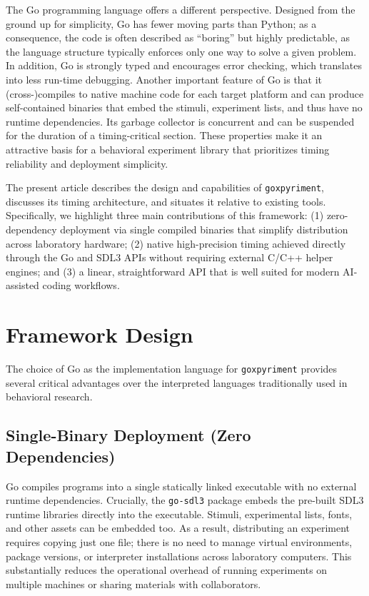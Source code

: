 \documentclass[jou,a4paper]{apa7}
\begin{document}
The Go programming language \parencite{donovan2016} offers a different
perspective. Designed from the ground up for simplicity, Go has fewer
moving parts than Python; as a consequence, the code is often
described as ``boring'' but highly predictable, as the language
structure typically enforces only one way to solve a given problem. In
addition, Go is strongly typed and encourages error checking, which
translates into less run-time debugging. Another important feature of
Go is that it (cross-)compiles to native machine code for each target
platform and can produce self-contained binaries that embed the
stimuli, experiment lists, and thus have no runtime dependencies. Its
garbage collector is concurrent and can be suspended for the duration
of a timing-critical section. These properties make it an attractive
basis for a behavioral experiment library that prioritizes timing
reliability and deployment simplicity.

The present article describes the design and capabilities of
\texttt{goxpyriment}, discusses its timing architecture, and situates it
relative to existing tools. Specifically, we highlight three main contributions
of this framework: (1) zero-dependency deployment via single compiled binaries
that simplify distribution across laboratory hardware; (2) native high-precision
timing achieved directly through the Go and SDL3 APIs without requiring external
C/C++ helper engines; and (3) a linear, straightforward API that is well
suited for modern AI-assisted coding workflows.

\section{Framework Design}\label{framework-design}

The choice of Go as the implementation language for \texttt{goxpyriment} provides
several critical advantages over the interpreted languages traditionally used in
behavioral research.

\subsection{Single-Binary Deployment (Zero Dependencies)}\label{single-binary-deployment}

Go compiles programs into a single statically linked executable with no
external runtime dependencies. Crucially, the \texttt{go-sdl3} package
embeds the pre-built SDL3 runtime libraries \parencite{sdl3} directly into the
executable. Stimuli, experimental lists, fonts, and other assets can be
embedded too. As a result, distributing an experiment requires copying just one
file; there is no need to manage virtual environments, package
versions, or interpreter installations across laboratory
computers. This substantially reduces the operational overhead of
running experiments on multiple machines or sharing materials with
collaborators.
\end{document}
